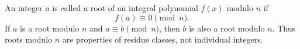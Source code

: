 An integer $a$ is called a root of an integral polynomial $f(x)$ modulo $n$ if
$$f(a) \equiv 0 \pmod{n}.$$
If $a$ is a root modulo $n$ and $a \equiv b \pmod{n}$, then $b$ is also a root modulo $n$. Thus roots modulo $n$ are properties of residue classes, not individual integers.
